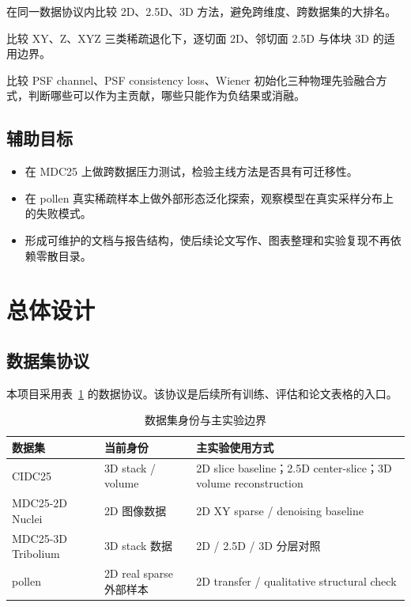 \documentclass[UTF8, scheme=plain, 11pt, a4paper]{ctexart}
\begin{document}
\begin{description}[leftmargin=*, style=nextline]
  \item[目标一：建立维度一致的稀疏重建 benchmark]
  在同一数据协议内比较 2D、2.5D、3D 方法，避免跨维度、跨数据集的大排名。

  \item[目标二：判断不同稀疏模式下的最优模型族]
  比较 XY、Z、XYZ 三类稀疏退化下，逐切面 2D、邻切面 2.5D 与体块 3D 的适用边界。

  \item[目标三：评估 PSF 物理先验的有效注入方式]
  比较 PSF channel、PSF consistency loss、Wiener 初始化三种物理先验融合方式，判断哪些可以作为主贡献，哪些只能作为负结果或消融。
\end{description}

\subsection{辅助目标}

\begin{itemize}[leftmargin=*]
  \item 在 MDC25 上做跨数据压力测试，检验主线方法是否具有可迁移性。
  \item 在 pollen 真实稀疏样本上做外部形态泛化探索，观察模型在真实采样分布上的失败模式。
  \item 形成可维护的文档与报告结构，使后续论文写作、图表整理和实验复现不再依赖零散目录。
\end{itemize}

\section{总体设计}

\subsection{数据集协议}

本项目采用表~\ref{tab:dataset_protocol} 的数据协议。该协议是后续所有训练、评估和论文表格的入口。

\begin{table}[H]
  \centering
  \caption{数据集身份与主实验边界}
  \label{tab:dataset_protocol}
  \begin{tabular}{p{3.2cm}p{4.0cm}p{5.5cm}}
    \toprule
    数据集 & 当前身份 & 主实验使用方式 \\
    \midrule
    CIDC25 & 3D stack / volume & 2D slice baseline；2.5D center-slice；3D volume reconstruction \\
    MDC25-2D Nuclei & 2D 图像数据 & 2D XY sparse / denoising baseline \\
    MDC25-3D Tribolium & 3D stack 数据 & 2D / 2.5D / 3D 分层对照 \\
    pollen & 2D real sparse 外部样本 & 2D transfer / qualitative structural check \\
    \bottomrule
  \end{tabular}
\end{table}
\end{document}
